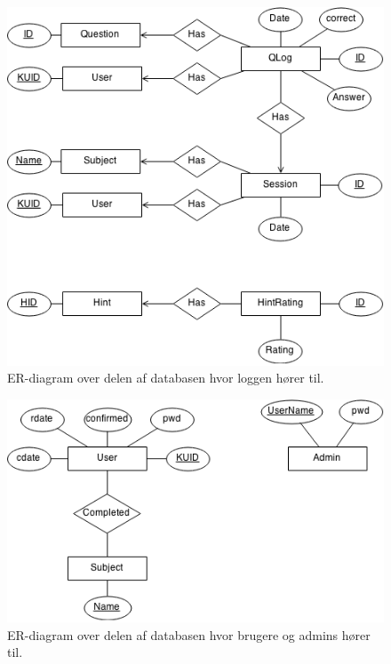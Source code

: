 \documentclass[11pt, a4paper]{article}
\begin{document}
\begin{figure}[h!]
    \centering
    \includegraphics[width=0.8\linewidth]{figures/er_diagram/Logdb.png}
    \caption{ER-diagram over delen af databasen hvor loggen hører til.}
    \label{fig:er_diagram_log}
\end{figure}

\begin{figure}[h!]
    \centering
    \includegraphics[width=0.8\linewidth]{figures/er_diagram/User.png}
    \caption{ER-diagram over delen af databasen hvor brugere og admins hører til.}
    \label{fig:er_diagram_user}
\end{figure}
\end{document}
